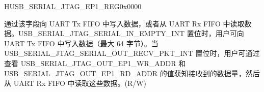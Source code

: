 \begin{register}{H}{USB\_SERIAL\_JTAG\_EP1\_REG}{0x0000}\label{regdesc:USBSERIALJTAGEP1REG}
%
%
\regnewline%
\begin{regdesc}\begin{reglist}
\label{fielddesc:USBSERIALJTAGRDWRBYTE}\item [USB\_SERIAL\_JTAG\_RDWR\_BYTE] 通过该字段向 UART Tx FIFO 中写入数据，或者从 UART Rx FIFO 中读取数据。USB\_SERIAL\_JTAG\_SERIAL\_IN\_EMPTY\_INT 置位时，用户可向 UART Tx FIFO 中写入数据（最大 64 字节）。当 USB\_SERIAL\_JTAG\_SERIAL\_OUT\_RECV\_PKT\_INT 置位时，用户可通过查看 USB\_SERIAL\_JTAG\_OUT\_EP1\_WR\_ADDR 和 USB\_SERIAL\_JTAG\_OUT\_EP1\_RD\_ADDR 的值获知接收到的数据量，然后从 UART Rx FIFO 中读取这些数据。(R/W)
\end{reglist}\end{regdesc}
\end{register}


